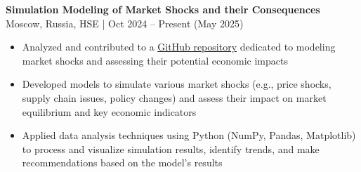 \textbf{Simulation Modeling of Market Shocks and their Consequences} \hfill Moscow, Russia, HSE | Oct 2024 – Present (May 2025)
\begin{itemize}[noitemsep, topsep=0pt, partopsep=0pt, parsep=0pt]
    \item Analyzed and contributed to a \href{https://github.com/bognik002/2D-ABM}{GitHub repository} dedicated to modeling market shocks and assessing their potential economic impacts
    \item Developed models to simulate various market shocks (e.g., price shocks, supply chain issues, policy changes) and assess their impact on market equilibrium and key economic indicators
    \item Applied data analysis techniques using Python (NumPy, Pandas, Matplotlib) to process and visualize simulation results, identify trends, and make recommendations based on the model's results
\end{itemize}
